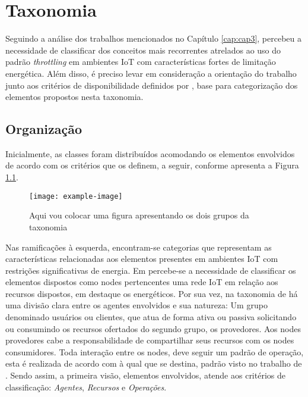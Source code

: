 \chapter{Taxonomia}
\label{cap:cap4}

Seguindo a análise dos trabalhos mencionados no Capítulo \ref{cap:cap3}, percebeu a necessidade de classificar dos conceitos mais recorrentes atrelados ao uso do padrão \textit{throttling} em ambientes IoT com características fortes de limitação energética. Além disso, é preciso levar em consideração a orientação do trabalho junto aos critérios de disponibilidade definidos por \cite{avizienis_basic_2004}, base para categorização dos elementos propostos nesta taxonomia. 

\section{Organização}

Inicialmente, as classes foram distribuídos acomodando os elementos envolvidos de acordo com os critérios que os definem, a seguir, conforme apresenta a Figura \ref{fig:taxonomia_geral}.


\begin{figure}[h]
\noindent\texttt{[image: example-image]} 
\caption{Aqui vou colocar uma figura apresentando os dois grupos da taxonomia}
\label{fig:taxonomia_geral}
\centering
\end{figure}

Nas ramificações à esquerda, encontram-se categorias que representam as características relacionadas aos elementos presentes em ambientes IoT com restrições significativas de energia. Em \cite{kansal_power_2007}  percebe-se a necessidade de classificar os elementos dispostos como nodes pertencentes uma rede IoT em relação aos recursos dispostos, em destaque os energéticos. Por sua vez, na taxonomia de \cite{avizienis_basic_2004} há uma divisão clara entre os agentes envolvidos e sua natureza: Um grupo denominado usuários ou clientes, que atua de forma ativa ou passiva solicitando ou consumindo os recursos ofertados do segundo grupo, os provedores. Aos nodes provedores cabe a responsabilidade de compartilhar seus recursos com os nodes consumidores. Toda interação entre os nodes, deve seguir um padrão de operação, esta é realizada de acordo com à qual que se destina, padrão visto no trabalho de \cite{khairnar_discrete-rate_2015}. Sendo assim, a primeira visão, elementos envolvidos, atende aos critérios de classificação: \textit{Agentes}, \textit{Recursos} e \textit{Operações}.

